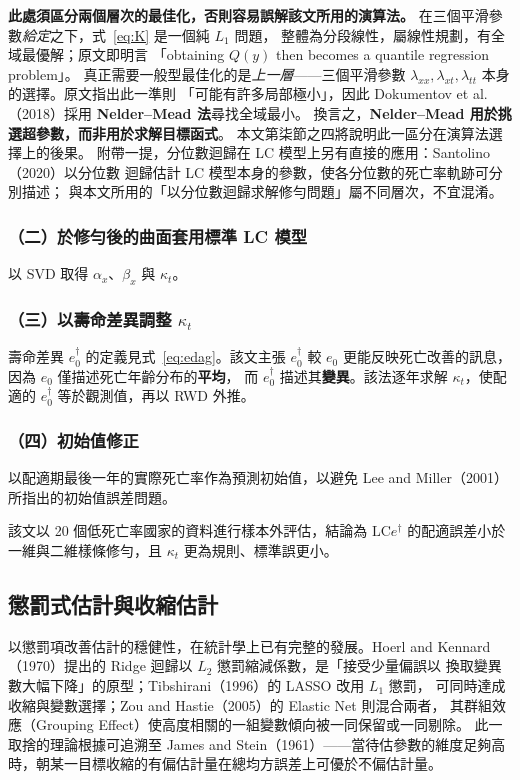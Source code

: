 \documentclass[UTF8, fontset=macnew, a4paper, 12pt]{ctexart}
\newcommand{\edag}{e_0^{\dagger}}
\newcommand{\LCe}{\mathrm{LC}e^{\dagger}}
\begin{document}
\textbf{此處須區分兩個層次的最佳化，否則容易誤解該文所用的演算法。}
在三個平滑參數\emph{給定}之下，式~\eqref{eq:K} 是一個純 $L_1$ 問題，
整體為分段線性，屬線性規劃，有全域最優解；原文即明言
「obtaining $Q(y)$ then becomes a quantile regression problem」。
真正需要一般型最佳化的是\emph{上一層}——三個平滑參數
$\lambda_{xx},\lambda_{xt},\lambda_{tt}$ 本身的選擇。原文指出此一準則
「可能有許多局部極小」，因此 Dokumentov et al.（2018）採用
\textbf{Nelder--Mead 法}尋找全域最小。
換言之，\textbf{Nelder--Mead 用於挑選超參數，而非用於求解目標函式}。
本文第柒節之四將說明此一區分在演算法選擇上的後果。
附帶一提，分位數迴歸在 LC 模型上另有直接的應用：Santolino（2020）以分位數
迴歸估計 LC 模型本身的參數，使各分位數的死亡率軌跡可分別描述；
與本文所用的「以分位數迴歸求解修勻問題」屬不同層次，不宜混淆。

\subsubsection{（二）於修勻後的曲面套用標準 LC 模型}

以 SVD 取得 $\alpha_x$、$\beta_x$ 與 $\kappa_t$。

\subsubsection{（三）以壽命差異調整 $\kappa_t$}

壽命差異 $\edag$ 的定義見式~\eqref{eq:edag}。該文主張 $\edag$ 較 $e_0$
更能反映死亡改善的訊息，因為 $e_0$ 僅描述死亡年齡分布的\textbf{平均}，
而 $\edag$ 描述其\textbf{變異}。該法逐年求解 $\kappa_t$，使配適的 $\edag$
等於觀測值，再以 RWD 外推。

\subsubsection{（四）初始值修正}

以配適期最後一年的實際死亡率作為預測初始值，以避免 Lee and Miller（2001）
所指出的初始值誤差問題。

該文以 20 個低死亡率國家的資料進行樣本外評估，結論為 $\LCe$ 的配適誤差小於
一維與二維樣條修勻，且 $\kappa_t$ 更為規則、標準誤更小。

\subsection{懲罰式估計與收縮估計}

以懲罰項改善估計的穩健性，在統計學上已有完整的發展。Hoerl and
Kennard（1970）提出的 Ridge 迴歸以 $L_2$ 懲罰縮減係數，是「接受少量偏誤以
換取變異數大幅下降」的原型；Tibshirani（1996）的 LASSO 改用 $L_1$ 懲罰，
可同時達成收縮與變數選擇；Zou and Hastie（2005）的 Elastic Net 則混合兩者，
其群組效應（Grouping Effect）使高度相關的一組變數傾向被一同保留或一同剔除。
此一取捨的理論根據可追溯至 James and Stein（1961）——當待估參數的維度足夠高
時，朝某一目標收縮的有偏估計量在總均方誤差上可優於不偏估計量。
\end{document}
